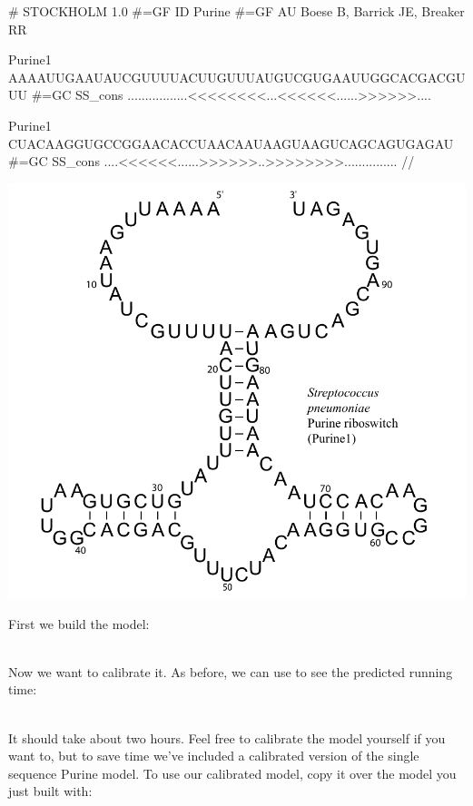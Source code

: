 {\samepage
\vspace{1em}
\begin{minipage}{4.7in}
\begin{sreoutput}
# STOCKHOLM 1.0
#=GF ID    Purine
#=GF AU    Boese B, Barrick JE, Breaker RR

Purine1          AAAAUUGAAUAUCGUUUUACUUGUUUAUGUCGUGAAUUGGCACGACGUUU
#=GC SS_cons     .................<<<<<<<<...<<<<<<......>>>>>>....

Purine1          CUACAAGGUGCCGGAACACCUAACAAUAAGUAAGUCAGCAGUGAGAU
#=GC SS_cons     ....<<<<<<......>>>>>>..>>>>>>>>...............
//
\end{sreoutput}
\end{minipage}
\begin{minipage}{1.5in}
\includegraphics[scale=0.37]{Figures/purine1_full}
\end{minipage}
\vspace{1em}
}

First we build the model:

\\

Now we want to calibrate it. As before, we can use 
to see the predicted running time:

\\

It should take about two hours. Feel free to calibrate the model yourself if you want
to, but to save time we've included  a
calibrated version of the single sequence Purine model. To use our
calibrated model, copy it over the model you just built with:

